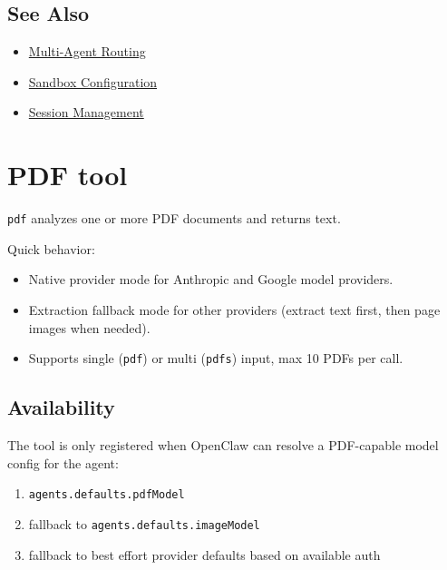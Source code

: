 \hrulefill


\subsection{See Also}


\begin{itemize}
  \item \href{/concepts/multi-agent}{Multi-Agent Routing}
  \item \href{/gateway/configuration\#agentsdefaults-sandbox}{Sandbox Configuration}
  \item \href{/concepts/session}{Session Management}
\end{itemize}



\clearpage

\section{PDF tool}


\texttt{pdf} analyzes one or more PDF documents and returns text.

Quick behavior:

\begin{itemize}
  \item Native provider mode for Anthropic and Google model providers.
  \item Extraction fallback mode for other providers (extract text first, then page images when needed).
  \item Supports single (\texttt{pdf}) or multi (\texttt{pdfs}) input, max 10 PDFs per call.
\end{itemize}


\subsection{Availability}


The tool is only registered when OpenClaw can resolve a PDF-capable model config for the agent:

\begin{enumerate}
  \item \texttt{agents.defaults.pdfModel}
  \item fallback to \texttt{agents.defaults.imageModel}
  \item fallback to best effort provider defaults based on available auth
\end{enumerate}


